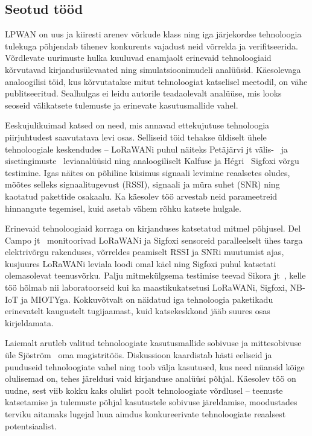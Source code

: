 \documentclass[12pt]{article}
\newcommand{\TODO}{\todo[inline]}
\begin{document}
\TODO{Litsentseerimata sagedusalas\ldots}

\subsection{Seotud tööd}
LPWAN on uus ja kiiresti arenev võrkude klass ning iga järjekordse tehnoloogia tulekuga põhjendab tihenev konkurents vajadust neid võrrelda ja verifitseerida.
Võrdlevate uurimuste hulka kuuluvad enamjaolt erinevaid tehnoloogiaid kõrvutavad kirjandusülevaated ning simulatsioonimudeli analüüsid.
Käesolevaga analoogilisi töid, kus kõrvutatakse mitut tehnoloogiat katselisel meetodil, on vähe publitseeritud.
Sealhulgas ei leidu autorile teadaolevalt analüüse, mis looks seoseid välikatsete tulemuste ja erinevate kasutusmallide vahel.

Eeskujulikuimad katsed on need, mis annavad ettekujutuse tehnoloogia piirjuhtudest saavutatava levi osas.
Selliseid töid tehakse üldiselt ühele tehnoloogiale keskendudes -- LoRaWANi puhul näiteks Petäjärvi jt välis-~\cite{petajajarvi2015coverage} ja sisetingimuste~\cite{petajajarvi} levianalüüsid ning analoogiliselt Kalfuse ja Hégri~\cite{kalfus2016ultra} Sigfoxi võrgu testimine.
Igas näites on põhiline küsimus signaali levimine reaalsetes oludes, mõõtes selleks signaalitugevust (RSSI), signaali ja müra suhet (SNR) ning kaotatud pakettide osakaalu.
Ka käesolev töö arvestab neid parameetreid hinnangute tegemisel, kuid asetab vähem rõhku katsete hulgale.

Erinevaid tehnoloogiaid korraga on kirjanduses katsetatud mitmel põhjusel.
Del Campo jt~\cite{del2019hybrid} monitoorivad LoRaWANi ja Sigfoxi sensoreid paralleelselt ühes targa elektrivõrgu rakenduses, võrreldes peamiselt RSSI ja SNRi muutumist ajas, kusjuures LoRaWANi leviala loodi omal käel ning Sigfoxi puhul katsetati olemasolevat teenusvõrku.
Palju mitmekülgsema testimise teevad Sikora jt~\cite{sikora2019test}, kelle töö hõlmab nii laboratoorseid kui ka maastikukatsetusi LoRaWANi, Sigfoxi, NB-IoT ja MIOTYga.
Kokkuvõtvalt on näidatud iga tehnoloogia paketikadu erinevatelt kaugustelt tugijaamast, kuid katsekeskkond jääb suures osas kirjeldamata.

Laiemalt arutleb valitud tehnoloogiate kasutusmallide sobivuse ja mittesobivuse üle Sjöström~\cite{sjostrom2017unlicensed} oma magistritöös.
Diskussioon kaardistab hästi eeliseid ja puuduseid tehnoloogiate vahel ning toob välja kasutused, kus need nüansid kõige olulisemad on, tehes järeldusi vaid kirjanduse analüüsi põhjal.
Käesolev töö on uudne, sest viib kokku kaks olulist poolt tehnoloogiate võrdlusel -- teenuste katsetamise ja tulemuste põhjal kasutustele sobivuse järeldamise, moodustades terviku aitamaks lugejal luua aimdus konkureerivate tehnoloogiate reaalsest potentsiaalist.
\end{document}
